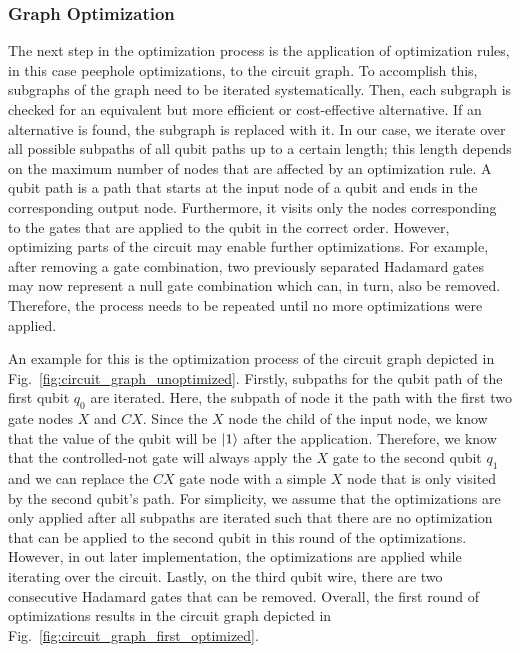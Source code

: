 \subsubsection{Graph Optimization}
The next step in the optimization process is the application of optimization rules, in this case peephole optimizations, to the circuit graph. To accomplish this, subgraphs of the graph need to be iterated systematically. Then, each subgraph is checked for an equivalent but more efficient or cost-effective alternative. If an alternative is found, the subgraph is replaced with it. In our case, we iterate over all possible subpaths of all qubit paths up to a certain length; this length depends on the maximum number of nodes that are affected by an optimization rule. A qubit path is a path that starts at the input node of a qubit and ends in the corresponding output node. Furthermore, it visits only the nodes corresponding to the gates that are applied to the qubit in the correct order. However, optimizing parts of the circuit may enable further optimizations. For example, after removing a gate combination, two previously separated Hadamard gates may now represent a null gate combination which can, in turn, also be removed. Therefore, the process needs to be repeated until no more optimizations were applied.

An example for this is the optimization process of the circuit graph depicted in Fig.~\ref{fig:circuit_graph_unoptimized}. Firstly, subpaths for the qubit path of the first qubit $q_0$ are iterated. Here, the subpath of node it the path with the first two gate nodes $X$ and $CX$. Since the $X$ node the child of the input node, we know that the value of the qubit will be $\ket{1}$ after the application. Therefore, we know that the controlled-not gate will always apply the $X$ gate to the second qubit $q_1$ and we can replace the $CX$ gate node with a simple $X$ node that is only visited by the second qubit's path. For simplicity, we assume that the optimizations are only applied after all subpaths are iterated such that there are no optimization that can be applied to the second qubit in this round of the optimizations. However, in out later implementation, the optimizations are applied while iterating over the circuit. Lastly, on the third qubit wire, there are two consecutive Hadamard gates that can be removed. Overall, the first round of optimizations results in the circuit graph depicted in Fig.~\ref{fig:circuit_graph_first_optimized}. 
 
